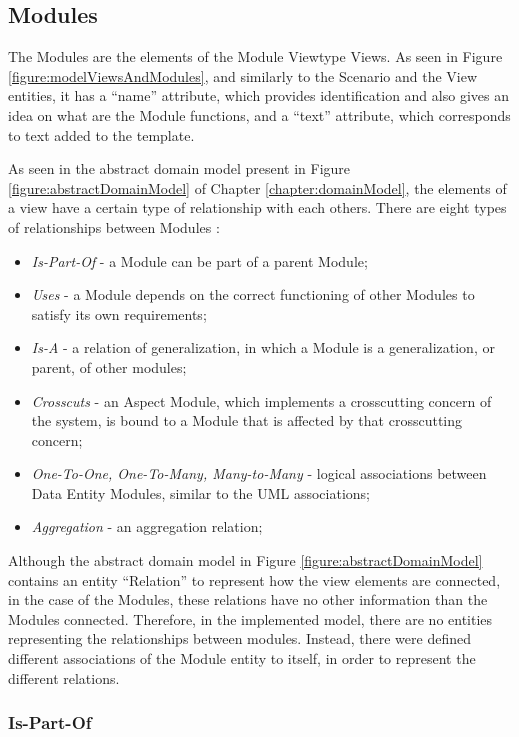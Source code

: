 \subsection{Modules}
\label{subsection:modules}

The Modules are the elements of the Module Viewtype Views. As seen in Figure \ref{figure:modelViewsAndModules}, and similarly to the Scenario and the View entities, it has a ``name'' attribute, which provides identification and also gives an idea on what are the Module functions, and a ``text'' attribute, which corresponds to text added to the template.

As seen in the abstract domain model present in Figure \ref{figure:abstractDomainModel} of Chapter \ref{chapter:domainModel}, the elements of a view have a certain type of relationship with each others. There are eight types of relationships between Modules \cite{clements2003documenting}:
\begin{itemize}
\item \textit{Is-Part-Of} - a Module can be part of a parent Module; 
\item \textit{Uses} - a Module depends on the correct functioning of other Modules to satisfy its own requirements;
\item \textit{Is-A} - a relation of generalization, in which a Module is a generalization, or parent, of other modules; 
\item \textit{Crosscuts} - an Aspect Module, which implements a crosscutting concern of the system, is bound to a Module that is affected by that crosscutting concern;
\item \textit{One-To-One, One-To-Many, Many-to-Many} - logical associations between Data Entity Modules, similar to the UML associations;
\item \textit{Aggregation} - an aggregation relation;
\end{itemize}

Although the abstract domain model in Figure \ref{figure:abstractDomainModel} contains an entity ``Relation'' to represent how the view elements are connected, in the case of the Modules, these relations have no other information than the Modules connected. Therefore, in the implemented model, there are no entities representing the relationships between modules. Instead, there were defined different associations of the Module entity to itself, in order to represent the different relations.

\subsubsection{Is-Part-Of}

